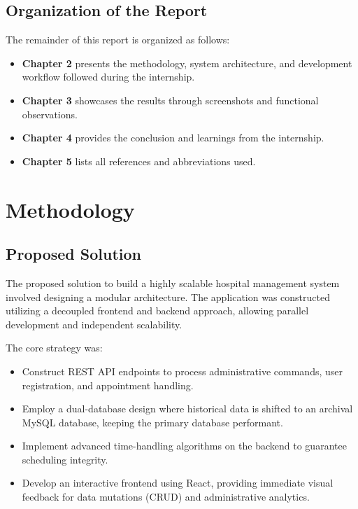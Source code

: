 \documentclass[12pt,a4paper]{article}
\begin{document}
\subsection{Organization of the Report}

The remainder of this report is organized as follows:
\begin{itemize}
    \item \textbf{Chapter 2} presents the methodology, system architecture, and development workflow followed during the internship.
    \item \textbf{Chapter 3} showcases the results through screenshots and functional observations.
    \item \textbf{Chapter 4} provides the conclusion and learnings from the internship.
    \item \textbf{Chapter 5} lists all references and abbreviations used.
\end{itemize}

\newpage
\section{Methodology}
\label{chap:methodology}

\subsection{Proposed Solution}

The proposed solution to build a highly scalable hospital management system involved designing a modular architecture. The application was constructed utilizing a decoupled frontend and backend approach, allowing parallel development and independent scalability.

The core strategy was:
\begin{itemize}
    \item Construct REST API endpoints to process administrative commands, user registration, and appointment handling.
    \item Employ a dual-database design where historical data is shifted to an archival MySQL database, keeping the primary database performant.
    \item Implement advanced time-handling algorithms on the backend to guarantee scheduling integrity.
    \item Develop an interactive frontend using React, providing immediate visual feedback for data mutations (CRUD) and administrative analytics.
\end{itemize}
\end{document}
